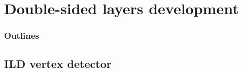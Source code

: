 \documentclass{beamer}
\begin{document}

\section{Double-sided layers development}
\begin{frame}
  \frametitle{Outlines}
  \begin{minipage}{\textwidth}
    \tableofcontents[currentsection,hideothersubsections, 
    sectionstyle=show/shaded]
  \end{minipage}
\end{frame}

  \subsection{ILD vertex detector}
\end{document}
